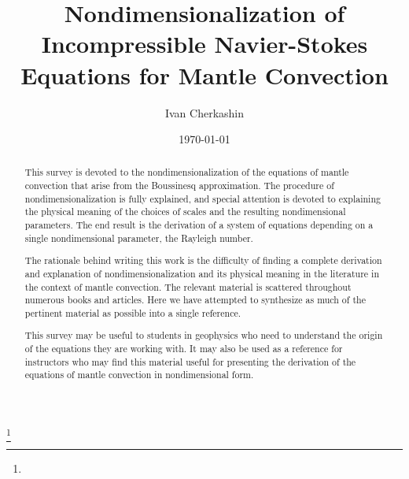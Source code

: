 \documentclass[oneside]{amsbook}
\theoremstyle{definition}
\theoremstyle{remark}
\numberwithin{section}{chapter}
\numberwithin{equation}{chapter}
\begin{document}
\frontmatter

\title{Nondimensionalization of Incompressible Navier-Stokes Equations for Mantle Convection}


\author{Ivan Cherkashin}
\address{University of California, Davis}
\curraddr{}

\address{}
\curraddr{}
\thanks{}



\date{\today}

\begin{abstract}

This survey is devoted to the nondimensionalization of the equations of mantle convection that arise from the Boussinesq approximation. The procedure of nondimensionalization is fully explained, and special attention is devoted to explaining the physical meaning of the choices of scales and the resulting nondimensional parameters. The end result is the derivation of a system of equations depending on a single nondimensional parameter, the Rayleigh number.

The rationale behind writing this work is the difficulty of finding a complete derivation and explanation of nondimensionalization and its physical meaning in the literature in the context of mantle convection. The relevant material is scattered throughout numerous books and articles. Here we have attempted to synthesize as much of the pertinent material as possible into a single reference.

This survey may be useful to students in geophysics who need to understand the origin of the equations they are working with. It may also be used as a reference for instructors who may find this material useful for presenting the derivation of the equations of mantle convection in nondimensional form.   

\end{abstract}

\maketitle
\end{document}
